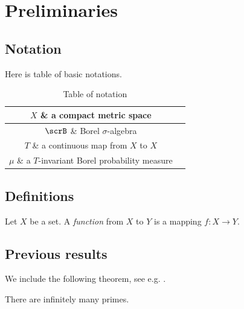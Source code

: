 
\chapter{Preliminaries} \label{chp:preliminaries}

\section{Notation}

Here is table of basic notations.

\begin{table}[H]
	\centering
	\begin{tabular}{c|c}
		\hline
		$ X $ \& a compact metric space \\
		\hline
		$ \scrB $ \& Borel $ \sigma $\nobreakdash-algebra\\
		\hline
		$ T $ \& a continuous map from $ X $ to $ X $ \\
		\hline
		$ \mu $ \& a $ T $\nobreakdash-invariant Borel probability measure \\
		\hline
 	\end{tabular}
	\caption{Table of notation}
\end{table}


\section{Definitions}
\begin{definition}
	Let $X$ be a set. A \emph{function} from $X$ to $Y$ is a mapping $f \colon X \to Y$.
\end{definition}

\section{Previous results}

We include the following theorem, see e.g. \cite{HardyWright2008}.
\begin{theorem}
	There are infinitely many primes.
\end{theorem}